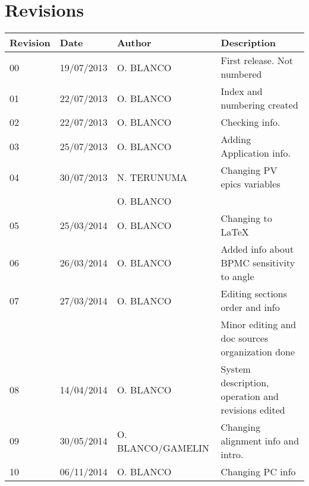 \section{Revisions}
\begin{tabular}{|l|l|l|l|}\hline
Revision&Date&Author&Description\\\hline\hline
00&19/07/2013&O. BLANCO&First release. Not numbered\\\hline
01&22/07/2013&O. BLANCO&Index and numbering created\\\hline
02&22/07/2013&O. BLANCO&Checking info.\\\hline
03&25/07/2013&O. BLANCO&Adding Application info.\\\hline
04&30/07/2013&N. TERUNUMA&Changing PV epics variables\\
&&O. BLANCO&\\\hline
05&25/03/2014&O. BLANCO&Changing to \LaTeX\\\hline
06&26/03/2014&O. BLANCO&Added info about BPMC sensitivity to angle\\\hline
07&27/03/2014&O. BLANCO&Editing sections order and info\\
&&&Minor editing and doc sources organization done\\\hline
08&14/04/2014&O. BLANCO&System description, operation and revisions edited\\\hline
09&30/05/2014&O. BLANCO/GAMELIN&Changing alignment info and intro.\\\hline
10&06/11/2014&O. BLANCO&Changing PC info\\\hline
\end{tabular}


